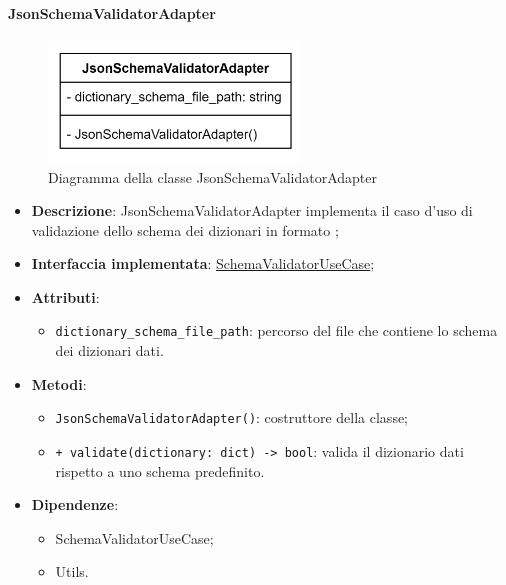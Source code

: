 \paragraph{JsonSchemaValidatorAdapter} \label{JsonSchemaValidatorAdapter}
\begin{figure}[H]
    \centering
    \includegraphics[width=0.6\textwidth]{assets/Backend/json_schema_validator_adapter.png}
    \caption{Diagramma della classe JsonSchemaValidatorAdapter}
  \end{figure}
\begin{itemize}
    \item \textbf{Descrizione}: JsonSchemaValidatorAdapter implementa il caso d'uso di validazione dello schema dei dizionari in formato ;
    \item \textbf{Interfaccia implementata}: \hyperref[SchemaValidatorUseCase]{SchemaValidatorUseCase};
    \item \textbf{Attributi}:
    \begin{itemize}
        \item \texttt{dictionary\_schema\_file\_path}: percorso del file  che contiene lo schema dei dizionari dati.
    \end{itemize}
    \item \textbf{Metodi}:
    \begin{itemize}
        \item \texttt{JsonSchemaValidatorAdapter()}: costruttore della classe;
        \item \texttt{+ validate(dictionary: dict) -> bool}: valida il dizionario dati rispetto a uno schema predefinito.
    \end{itemize}
    \item \textbf{Dipendenze}:
    \begin{itemize}
        \item SchemaValidatorUseCase;
        \item Utils.
    \end{itemize}
\end{itemize} 


